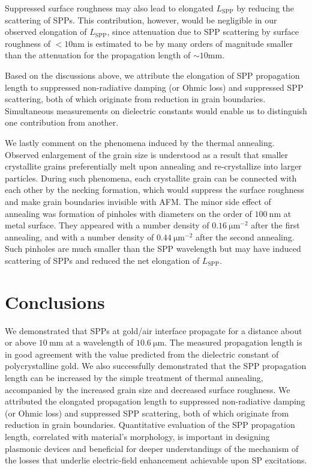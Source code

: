 \documentclass[aip,apl,reprint]{revtex4-1}
\begin{document}
 
Suppressed surface roughness may also lead to elongated $L_{\mathrm{SPP}}$ by reducing the scattering of SPPs. This contribution, however, would be negligible in our observed elongation of $L_{\mathrm{SPP}}$, since attenuation due to SPP scattering by surface roughness of $<10 \mathrm{nm}$ is estimated to be by many orders of magnitude smaller than the attenuation for the propagation length of $\sim10 \mathrm{mm}$\cite{Shiba, Kuttge, Mills}.

Based on the discussions above, we attribute the elongation of SPP propagation length to suppressed non-radiative damping (or Ohmic loss) and suppressed SPP scattering, both of which originate from reduction in grain boundaries. Simultaneous measurements on dielectric constants would enable us to distinguish one contribution from another.

We lastly comment on the phenomena induced by the thermal annealing.
Observed enlargement of the grain size is understood as a result that smaller crystallite grains preferentially melt upon annealing\cite{Buffat} and re-crystallize into larger particles. 
During such phenomena, each crystallite grain can be connected with each other by the necking formation, which would suppress the surface roughness and make grain boundaries invisible with AFM. The minor side effect of annealing was formation of pinholes with diameters on the order of $100\:\mathrm{nm}$ at metal surface. They appeared with a number density of $0.16\:\mathrm{\mu m}^{-2}$ after the first annealing, and with a number density of $0.44\:\mathrm{\mu m}^{-2}$ after the second annealing. Such pinholes are much smaller than the SPP wavelength but may have induced scattering of SPPs and reduced the net elongation of $L_{\mathrm{SPP}}$.
	
\section{Conclusions}
\label{sec:conclusion}
We demonstrated that SPPs at gold/air interface propagate for a distance about or above $10\:\mathrm{mm}$ at a wavelength of $10.6\:\mathrm{\mu m}$. The measured propagation length is in good agreement with the value predicted from the dielectric constant of polycrystalline gold. We also successfully demonstrated that the SPP propagation length can be increased by the simple treatment of thermal annealing, accompanied by the increased grain size and decreased surface roughness. 
We attributed the elongated propagation length to suppressed non-radiative damping (or Ohmic loss) and suppressed SPP scattering, both of which originate from reduction in grain boundaries. 
Quantitative evaluation of the SPP propagation length, correlated with material's morphology, is important in designing plasmonic devices and beneficial for deeper understandings of the mechanism of the losses that underlie electric-field enhancement achievable upon SP excitations.
\end{document}
